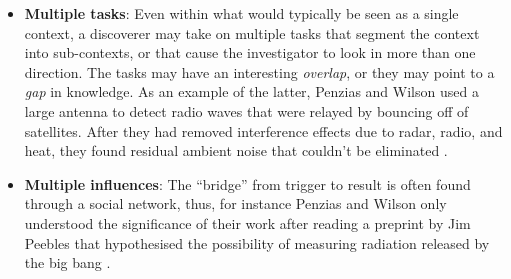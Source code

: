 \begin{itemize}
\item \textbf{Multiple tasks}: Even within what would typically be
  seen as a single context, a discoverer may take on multiple tasks
  that segment the context into sub-contexts, or that cause the
  investigator to look in more than one direction.  The tasks may have
  an interesting \emph{overlap}, or they may point to a \emph{gap} in
  knowledge.  As an example of the latter, Penzias and Wilson used a
  large antenna to detect radio waves that were relayed by bouncing
  off of satellites.  After they had removed interference effects due
  to radar, radio, and heat, they found residual ambient noise that
  couldn't be eliminated \cite{wiki:cosmic-radiation}.
\end{itemize}

\begin{itemize}
\item \textbf{Multiple influences}: The ``bridge'' from trigger to
  result is often found through a social network, thus, for instance
  Penzias and Wilson only understood the significance of their work
  after reading a preprint by Jim Peebles that hypothesised the
  possibility of measuring radiation released by the big bang
  \cite{wiki:cosmic-radiation}.
\end{itemize}
